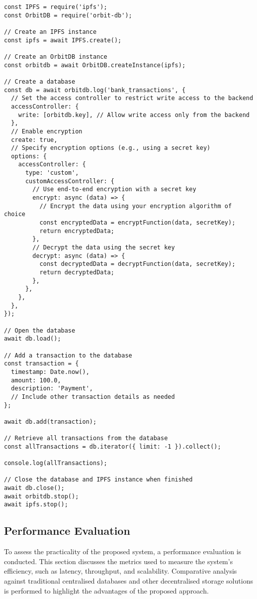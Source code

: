 \documentclass[a4paper,11 pt]{article}
\theoremstyle{definition}
\begin{document}
\begin{verbatim}
const IPFS = require('ipfs');
const OrbitDB = require('orbit-db');

// Create an IPFS instance
const ipfs = await IPFS.create();

// Create an OrbitDB instance
const orbitdb = await OrbitDB.createInstance(ipfs);

// Create a database
const db = await orbitdb.log('bank_transactions', {
  // Set the access controller to restrict write access to the backend
  accessController: {
    write: [orbitdb.key], // Allow write access only from the backend
  },
  // Enable encryption
  create: true,
  // Specify encryption options (e.g., using a secret key)
  options: {
    accessController: {
      type: 'custom',
      customAccessController: {
        // Use end-to-end encryption with a secret key
        encrypt: async (data) => {
          // Encrypt the data using your encryption algorithm of choice
          const encryptedData = encryptFunction(data, secretKey);
          return encryptedData;
        },
        // Decrypt the data using the secret key
        decrypt: async (data) => {
          const decryptedData = decryptFunction(data, secretKey);
          return decryptedData;
        },
      },
    },
  },
});

// Open the database
await db.load();

// Add a transaction to the database
const transaction = {
  timestamp: Date.now(),
  amount: 100.0,
  description: 'Payment',
  // Include other transaction details as needed
};

await db.add(transaction);

// Retrieve all transactions from the database
const allTransactions = db.iterator({ limit: -1 }).collect();

console.log(allTransactions);

// Close the database and IPFS instance when finished
await db.close();
await orbitdb.stop();
await ipfs.stop();
\end{verbatim}

\subsection{Performance Evaluation}
To assess the practicality of the proposed system, a performance evaluation is conducted. This section discusses the metrics used to measure the system's efficiency, such as latency, throughput, and scalability. Comparative analysis against traditional centralised databases and other decentralised storage solutions is performed to highlight the advantages of the proposed approach.
\end{document}

